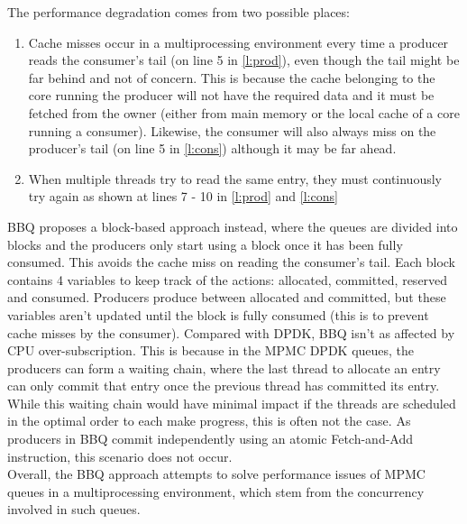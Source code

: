 The performance degradation comes from two possible places:
\begin{enumerate}
\item Cache misses occur in a multiprocessing environment every time a producer reads the
consumer's tail (on line 5 in \autoref{l:prod}), even though the tail might be far behind and not
of concern. This is because the cache belonging to the core running the producer will not have the
required data and it must be fetched from the owner (either from main memory or the local cache of
a core running a consumer). Likewise, the consumer will also always miss on the 
producer's tail (on line 5 in \autoref{l:cons}) although it may be far ahead.
\item When multiple threads try to read the same entry, they must continuously try again as shown at lines 7 - 10 in 
\autoref{l:prod} and \autoref{l:cons}
\end{enumerate}

BBQ proposes a block-based approach instead, where the queues are divided into blocks and the producers only
start using a block once it has been fully consumed. This avoids the cache miss on 
reading the consumer's tail. Each block contains 4 variables to keep track of the actions: allocated,
committed, reserved and consumed. Producers produce between allocated and committed, but these variables 
aren’t updated until the block is fully consumed (this is to prevent cache misses by the consumer).
Compared with DPDK, BBQ isn't as affected by CPU over-subscription. This is because in the MPMC
DPDK queues, the producers can form a waiting chain, where the last thread to allocate an entry can only 
commit that entry once the previous thread has committed its entry. While this waiting chain would have 
minimal impact if the threads are scheduled in the optimal order to each make progress, this is often not 
the case. As producers in BBQ commit independently using an atomic Fetch-and-Add 
instruction, this scenario does not occur.\\
Overall, the BBQ approach attempts to solve performance issues of MPMC queues in a multiprocessing environment,
which stem from the concurrency involved in such queues. 

